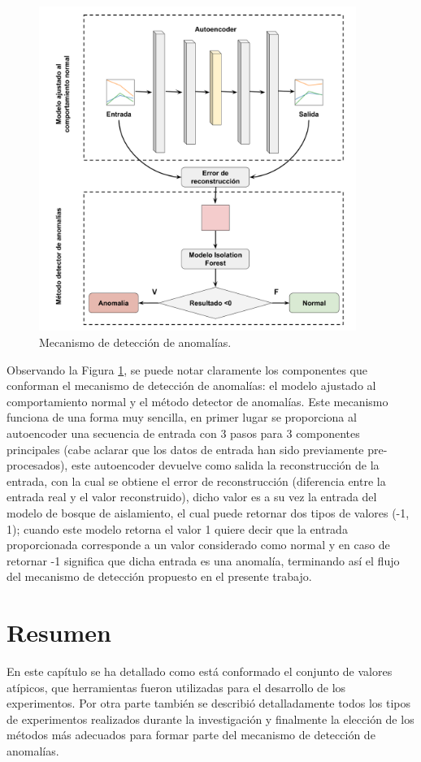 \begin{figure}[H]
        \centering
            \includegraphics[width=0.92\textwidth, frame]{imagenes/Cap5/mecanismo}
        \caption{Mecanismo de detecci\'{o}n de anomal\'{i}as.}
		\label{fig:mecanismo}
\end{figure}

Observando la Figura \ref{fig:mecanismo}, se puede notar claramente los componentes que conforman el mecanismo de detecci\'{o}n de anomal\'{i}as: el modelo ajustado al comportamiento normal y el m\'{e}todo detector de anomal\'{i}as. Este mecanismo funciona de una forma muy sencilla, en primer lugar se proporciona al autoencoder una secuencia de entrada con 3 pasos para 3 componentes principales (cabe aclarar que los datos de entrada han sido previamente pre-procesados), este autoencoder devuelve como salida la reconstrucci\'{o}n de la entrada, con la cual se obtiene el error de reconstrucci\'{o}n (diferencia entre la entrada real y el valor reconstruido), dicho valor es a su vez la entrada del modelo de bosque de aislamiento, el cual puede retornar dos tipos de valores (-1, 1); cuando este modelo retorna el valor 1 quiere decir que la entrada proporcionada corresponde a un valor considerado como normal y en caso de retornar -1 significa que dicha entrada es una anomal\'{i}a, terminando as\'{i} el flujo del mecanismo de detecci\'{o}n propuesto en el presente trabajo.

\section{Resumen}

En este cap\'{i}tulo se ha detallado como est\'{a} conformado el conjunto de valores at\'{i}picos, que herramientas fueron utilizadas para el desarrollo de los experimentos. Por otra parte tambi\'{e}n se describi\'{o} detalladamente todos los tipos de experimentos realizados durante la investigaci\'{o}n y finalmente la elecci\'{o}n de los m\'{e}todos m\'{a}s adecuados para formar parte del mecanismo de detecci\'{o}n de anomal\'{i}as.
 